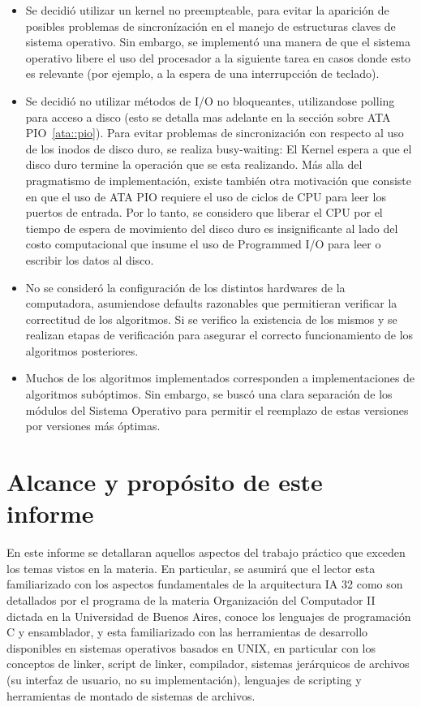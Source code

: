 \begin{itemize}
	\item Se decidi\'o utilizar un kernel no preempteable, para evitar la aparici\'on de posibles problemas
	de sincron\'izaci\'on en el manejo de estructuras claves de sistema operativo. Sin embargo, se implement\'o
	una manera de que el sistema operativo libere el uso del procesador a la siguiente tarea en casos donde esto
	es relevante (por ejemplo, a la espera de una interrupcci\'on de teclado).
	\item Se decidi\'o no utilizar m\'etodos de I/O no bloqueantes, utilizandose polling para acceso a disco
	(esto se detalla mas adelante en la secci\'on sobre ATA PIO~\ref{ata::pio}). Para evitar problemas de sincronizaci\'on
	con respecto al uso de los inodos de disco duro, se realiza busy-waiting: El Kernel espera a que el disco duro termine
	la operaci\'on que se esta realizando. M\'as alla del pragmatismo de implementaci\'on, existe tambi\'en otra motivaci\'on
	que consiste en que el uso de ATA PIO requiere el uso de ciclos de CPU para leer los puertos de entrada. Por lo tanto, se considero
	que liberar el CPU por el tiempo de espera de movimiento del disco duro es insignificante al lado del costo computacional que insume
	el uso de Programmed I/O para leer o escribir los datos al disco.
	\item No se consider\'o la configuraci\'on de los distintos hardwares de la computadora, asumiendose defaults razonables que
	permitieran verificar la correctitud de los algoritmos. Si se verifico la existencia de los mismos y se realizan etapas de
	verificaci\'on para asegurar el correcto funcionamiento de los algoritmos posteriores.
	\item Muchos de los algoritmos implementados corresponden a implementaciones de algoritmos sub\'optimos. Sin embargo, se
	busc\'o una clara separaci\'on de los m\'odulos del Sistema Operativo para permitir el reemplazo de estas versiones por versiones
	m\'as \'optimas.
\end{itemize}

\section{Alcance y prop\'osito de este informe}

En este informe se detallaran aquellos aspectos del trabajo pr\'actico que exceden los temas vistos en la materia. En particular,
se asumir\'a que el lector esta familiarizado con los aspectos fundamentales de la arquitectura IA 32 como son detallados por el programa de 
la materia Organizaci\'on del Computador II dictada en la Universidad de Buenos Aires, conoce los lenguajes de programaci\'on
C y ensamblador, y esta familiarizado con las herramientas de desarrollo disponibles en sistemas operativos basados en UNIX, en particular
con los conceptos de linker, script de linker, compilador, sistemas jer\'arquicos de archivos (su interfaz de usuario, no su implementaci\'on), 
lenguajes de scripting y herramientas de montado de sistemas de archivos.
